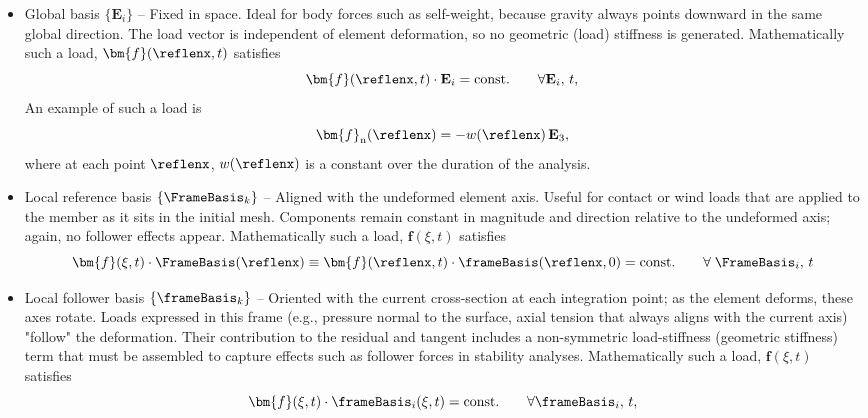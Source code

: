\begin{itemize}
\item Global basis \(\{\mathbf{E}_{i}\}\) – Fixed in space.  
Ideal for body forces such as self-weight, because gravity always points downward in the same global direction.  The load vector is independent of element deformation, so no geometric (load) stiffness is generated. Mathematically such a load, \(\bm{f}(\reflenx,t)\) satisfies
\begin{equation*}
    \bm{f}(\reflenx,t) \cdot \mathbf{E}_i = \mathrm{const.}
    \qquad\forall \mathbf{E}_i,\, t,
\end{equation*}
An example of such a load is 
\begin{equation*}
    \bm{f}_{\mathrm{n}}(\reflenx) = -w(\reflenx) \, \mathbf{E}_3,
\end{equation*}
where at each point \(\reflenx\), \(w(\reflenx)\) is a constant over the duration of the analysis.

\item Local reference basis \(\{\FrameBasis_k\}\) – Aligned with the undeformed element axis.  Useful for contact or wind loads that are applied to the member as it sits in the initial mesh.  Components remain constant in magnitude and direction relative to the undeformed axis; again, no follower effects appear.
Mathematically such a load, \(\bm{f}(\xi,t)\) satisfies
\begin{equation*}
    \bm{f}(\xi,t) \cdot \FrameBasis(\reflenx)  \equiv \bm{f}(\reflenx,t) \cdot \frameBasis(\reflenx,0) = \mathrm{const.}
    \qquad\forall\; \FrameBasis_i,\, t
\end{equation*}

\item Local follower basis \(\{\frameBasis_k\}\) – Oriented with the current cross-section at each integration point; as the element deforms, these axes rotate.  
Loads expressed in this frame (e.g., pressure normal to the surface, axial tension that always aligns with the current axis) "follow" the deformation.  
Their contribution to the residual and tangent includes a non-symmetric load-stiffness (geometric stiffness) term that must be assembled to capture effects such as follower forces in stability analyses.
Mathematically such a load, \(\bm{f}(\xi,t)\) satisfies
\begin{equation*}
    \bm{f}(\xi,t) \cdot \frameBasis_i(\xi,t) = \mathrm{const.}
    \qquad\forall \frameBasis_i,\, t,
\end{equation*}
\end{itemize}

